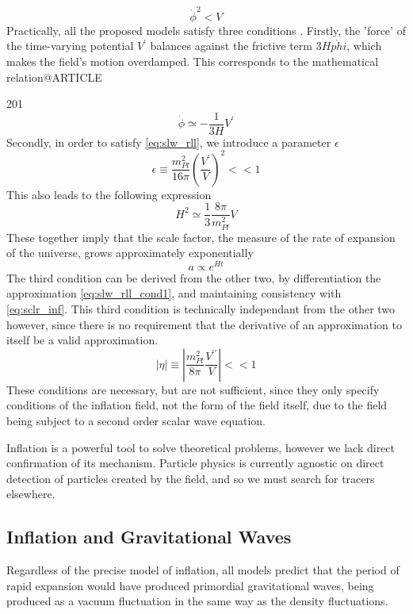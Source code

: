 \begin{equation}\label{eq:slw_rll}
	\dot{\phi}^2 < V
\end{equation}
Practically, all the proposed models satisfy three conditions \cite{LiddleLyth:00}. Firstly, the 'force' of the time-varying potential $V^\prime$ balances against the frictive term $3 H \dot{phi}$, which makes the field's motion overdamped. This corresponds to the mathematical relation@ARTICLE{201
\begin{equation}\label{eq:slw_rll_cond1}
	\dot{\phi} \simeq - \frac{1}{3 H} V^\prime
\end{equation}
Secondly, in order to satisfy \ref{eq:slw_rll}, we introduce a parameter $\epsilon$
\begin{equation}\label{eq:slw_rll_cond2}
	\epsilon \equiv \frac{m_{Pl}^2}{16 \pi} \left(\frac{V^\prime}{V}\right)^2 << 1
\end{equation}
This also leads to the following expression
$$ H^2 \simeq \frac{1}{3} \frac{8 \pi}{m_{Pl}^2} V $$
These together imply that the scale factor, the measure of the rate of expansion of the universe, grows approximately exponentially
$$a \propto e^{Ht} $$
The third condition can be derived from the other two, by differentiation the approximation \ref{eq:slw_rll_cond1}, and maintaining consistency with \ref{eq:sclr_inf}. This third condition is technically independant from the other two however, since there is no requirement that the derivative of an approximation to itself be a valid approximation.
\begin{equation}\label{eq:slw_rll_cond3}
	|\eta| \equiv \left| \frac{m_{Pl}^2}{8 \pi} \frac{V^{\prime \prime}}{V} \right| << 1
\end{equation}
These conditions are necessary, but are not sufficient, since they only specify conditions of the inflation field, not the form of the field itself, due to the field being subject to a second order scalar wave equation.

Inflation is a powerful tool to solve theoretical problems, however we lack direct confirmation of its mechanism. Particle physics is currently agnostic on direct detection of particles created by the field, and so we must search for tracers elsewhere.

\subsection{Inflation and Gravitational Waves}
Regardless of the precise model of inflation, all models predict that the period of rapid expansion would have produced primordial gravitational waves, being produced as a vacuum fluctuation in the same way as the density fluctuations.

}
